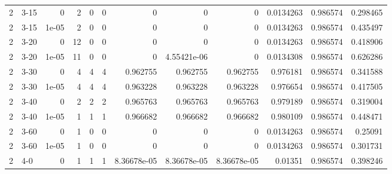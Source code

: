 \begin{tabular}{rlrrrrrrrrrr}
     2 & 3-15   &      0     &           2 &                 0 &                 0 &     0           &     0           &      0           &        0.0134263 &               0.986574 &           0.298465 \\
     2 & 3-15   &      1e-05 &           2 &                 0 &                 0 &     0           &     0           &      0           &        0.0134263 &               0.986574 &           0.435497 \\
     2 & 3-20   &      0     &          12 &                 0 &                 0 &     0           &     0           &      0           &        0.0134263 &               0.986574 &           0.418906 \\
     2 & 3-20   &      1e-05 &          11 &                 0 &                 0 &     0           &     4.55421e-06 &      0           &        0.0134308 &               0.986574 &           0.626286 \\
     2 & 3-30   &      0     &           4 &                 4 &                 4 &     0.962755    &     0.962755    &      0.962755    &        0.976181  &               0.986574 &           0.341588 \\
     2 & 3-30   &      1e-05 &           4 &                 4 &                 4 &     0.963228    &     0.963228    &      0.963228    &        0.976654  &               0.986574 &           0.417505 \\
     2 & 3-40   &      0     &           2 &                 2 &                 2 &     0.965763    &     0.965763    &      0.965763    &        0.979189  &               0.986574 &           0.319004 \\
     2 & 3-40   &      1e-05 &           1 &                 1 &                 1 &     0.966682    &     0.966682    &      0.966682    &        0.980109  &               0.986574 &           0.448471 \\
     2 & 3-60   &      0     &           1 &                 0 &                 0 &     0           &     0           &      0           &        0.0134263 &               0.986574 &           0.25091  \\
     2 & 3-60   &      1e-05 &           1 &                 0 &                 0 &     0           &     0           &      0           &        0.0134263 &               0.986574 &           0.301731 \\
     2 & 4-0    &      0     &           1 &                 1 &                 1 &     8.36678e-05 &     8.36678e-05 &      8.36678e-05 &        0.01351   &               0.986574 &           0.398246 \\

\end{tabular}
